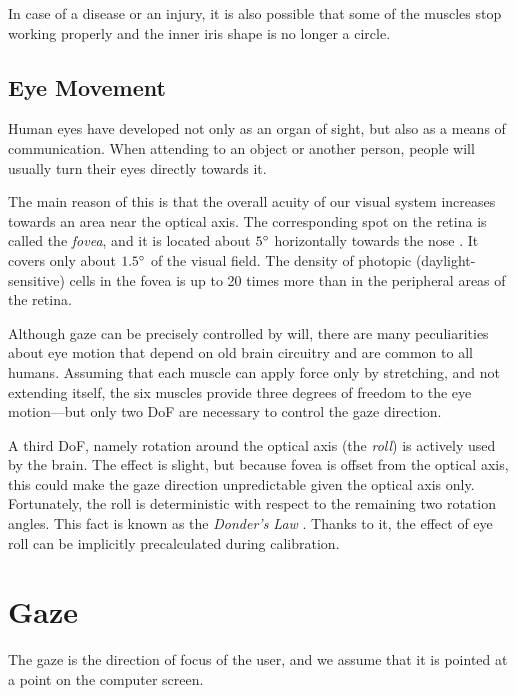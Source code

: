 In case of a disease or an injury, it is also possible that some of the muscles stop working properly and the inner iris shape is no longer a circle.

\subsection{Eye Movement}

Human eyes have developed not only as an organ of sight, but also as a means of communication.
When attending to an object or another person, people will usually turn their eyes directly towards it.

The main reason of this is that the overall acuity of our visual system increases towards an area near the optical axis.
The corresponding spot on the retina is called the \textit{fovea}, and it is located about $5\degree$ horizontally towards the nose \cite{villanueva08}.
It covers only about $1.5\degree$ of the visual field.
The density of photopic (daylight-sensitive) cells in the fovea is up to 20 times more than in the peripheral areas of the retina.

Although gaze can be precisely controlled by will, there are many peculiarities about eye motion that depend on old brain circuitry and are common to all humans.
Assuming that each muscle can apply force only by stretching, and not extending itself, the six muscles provide three degrees of freedom to the eye motion---but only two DoF are necessary to control the gaze direction.

A third DoF, namely rotation around the optical axis (the \textit{roll}) is actively used by the brain.
The effect is slight, but because fovea is offset from the optical axis, this could make the gaze direction unpredictable given the optical axis only.
Fortunately, the roll is deterministic with respect to the remaining two rotation angles.
This fact is known as the \textit{Donder's Law} \cite{hansen10}.
Thanks to it, the effect of eye roll can be implicitly precalculated during calibration.


\section{Gaze}
\label{s:gaze-model}

The gaze is the direction of focus of the user, and we assume that it is pointed at a point on the computer screen.

